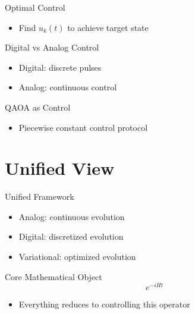\documentclass{beamer}
\begin{document}

\begin{frame}{Optimal Control}
\begin{itemize}
\item Find $u_k(t)$ to achieve target state
\end{itemize}
\end{frame}


\begin{frame}{Digital vs Analog Control}
\begin{itemize}
\item Digital: discrete pulses
\item Analog: continuous control
\end{itemize}
\end{frame}


\begin{frame}{QAOA as Control}
\begin{itemize}
\item Piecewise constant control protocol
\end{itemize}
\end{frame}

\section{Unified View}

\begin{frame}{Unified Framework}
\begin{itemize}
\item Analog: continuous evolution
\item Digital: discretized evolution
\item Variational: optimized evolution
\end{itemize}
\end{frame}


\begin{frame}{Core Mathematical Object}
\[
e^{-iHt}
\]
\begin{itemize}
\item Everything reduces to controlling this operator
\end{itemize}
\end{frame}
\end{document}
